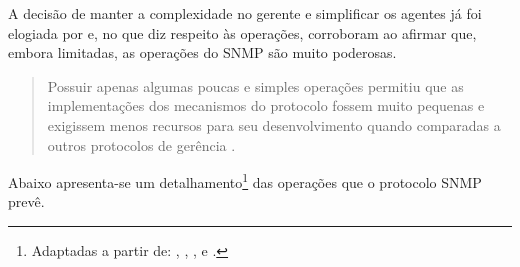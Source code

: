 \documentclass[twoside,english,brazilian]{UNISINOSmonografia}
\begin{document}
A decisão de manter a complexidade no gerente e simplificar os agentes já foi 
elogiada por  e, no que diz respeito às operações, 
 corroboram ao afirmar que, embora 
limitadas, as operações do SNMP são muito poderosas.

\begin{quote}
Possuir apenas algumas poucas e simples operações permitiu que as 
implementações dos mecanismos do protocolo fossem muito pequenas e exigissem 
menos recursos para seu desenvolvimento quando comparadas a outros protocolos 
de gerência
\cite[p.~185]{perkins1997understanding}.
\end{quote}

Abaixo apresenta-se um detalhamento\footnote{
	Adaptadas a partir de:
	,
	,
	,
	 e 
	.
} das operações que o protocolo SNMP prevê. 
\end{document}
